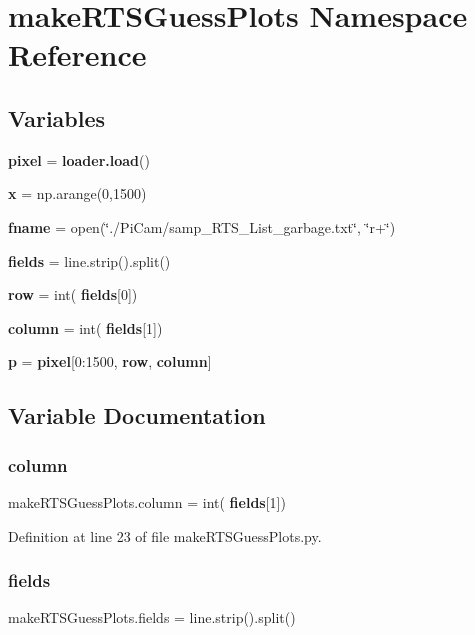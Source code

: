 \section{make\+R\+T\+S\+Guess\+Plots Namespace Reference}
\label{namespacemake_r_t_s_guess_plots}
\subsection*{Variables}
\begin{DoxyCompactItemize}
\item 
\textbf{ pixel} = \textbf{ loader.\+load}()
\item 
\textbf{ x} = np.\+arange(0,1500)
\item 
\textbf{ fname} = open(\char`\"{}./Pi\+Cam/samp\+\_\+\+R\+T\+S\+\_\+\+List\+\_\+garbage.\+txt\char`\"{}, \char`\"{}r+\char`\"{})
\item 
\textbf{ fields} = line.\+strip().split()
\item 
\textbf{ row} = int(\textbf{ fields}[0])
\item 
\textbf{ column} = int(\textbf{ fields}[1])
\item 
\textbf{ p} = \textbf{ pixel}[0\+:1500, \textbf{ row}, \textbf{ column}]
\end{DoxyCompactItemize}


\subsection{Variable Documentation}
\mbox{\label{namespacemake_r_t_s_guess_plots_a86b88df02bed43245f3eb2c93d078c91}} 
\subsubsection{column}
{\footnotesize\ttfamily make\+R\+T\+S\+Guess\+Plots.\+column = int(\textbf{ fields}[1])}



Definition at line 23 of file make\+R\+T\+S\+Guess\+Plots.\+py.

\mbox{\label{namespacemake_r_t_s_guess_plots_ad8db51b251427395443da3d6ef843553}} 
\subsubsection{fields}
{\footnotesize\ttfamily make\+R\+T\+S\+Guess\+Plots.\+fields = line.\+strip().split()}




